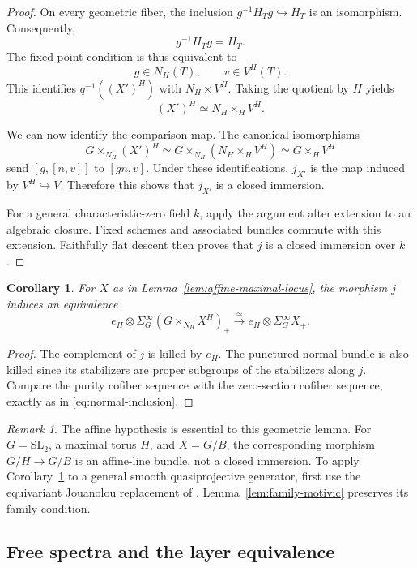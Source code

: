 \documentclass[11pt,reqno]{amsart}
\newtheorem{corollary}[theorem]{Corollary}
\theoremstyle{definition}
\theoremstyle{remark}
\newtheorem{remark}[theorem]{Remark}
\theoremstyle{plain}
\numberwithin{equation}{section}
\begin{document}
\begin{proof}
On every geometric fiber, the inclusion
\(g^{-1}H_Tg\hookrightarrow H_T\) is an isomorphism.
Consequently,
\[
 g^{-1}H_Tg=H_T.
\]
The fixed-point condition is thus equivalent to
\[
 g\in N_H(T),\qquad v\in V^H(T).
\]
This identifies \(q^{-1}((X')^H)\) with \(N_H\times V^H\).
Taking the quotient by \(H\) yields
\[
 (X')^H\simeq N_H\times_HV^H.
\]

We can now identify the comparison map.
The canonical isomorphisms
\[
 G\times_{N_H}(X')^H
 \simeq G\times_{N_H}(N_H\times_HV^H)
 \simeq G\times_HV^H
\]
send \([g,[n,v]]\) to \([gn,v]\).
Under these identifications, \(j_{X'}\) is the map induced
by \(V^H\hookrightarrow V\).
Therefore this shows that \(j_{X'}\)
is a closed immersion.

For a general characteristic-zero field \(k\), apply the
argument after extension to an algebraic closure.
Fixed schemes and associated bundles commute with this
extension.
Faithfully flat descent then proves that \(j\) is a closed
immersion over \(k\).
\end{proof}

\begin{corollary}\label{cor:affine-layer}
For \(X\) as in Lemma~\ref{lem:affine-maximal-locus}, the morphism
\(j\) induces an equivalence
\[
 e_H\otimes\Sigma^\infty_G(G\times_{N_H}X^H)_+
 \xrightarrow{\ \simeq\ }
 e_H\otimes\Sigma^\infty_GX_+.
\]
\end{corollary}

\begin{proof}
The complement of \(j\) is killed by \(e_H\).
The punctured normal bundle is also killed since its stabilizers
are proper subgroups of the stabilizers along \(j\).
Compare the purity cofiber sequence with the zero-section
cofiber sequence, exactly as in
\eqref{eq:normal-inclusion}.
\end{proof}

\begin{remark}
The affine hypothesis is essential to this geometric lemma.
For \(G=\mathrm{SL}_2\), a maximal torus \(H\), and \(X=G/B\),
the corresponding morphism \(G/H\to G/B\) is an affine-line
bundle, not a closed immersion.
To apply Corollary~\ref{cor:affine-layer} to a general smooth
quasiprojective generator, first use the equivariant Jouanolou
replacement of \cite[Proposition 2.20]{Hoyois}.
Lemma~\ref{lem:family-motivic} preserves its family condition.
\end{remark}

\subsection{Free spectra and the layer equivalence}
\end{document}
